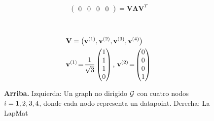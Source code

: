 {{{{\begin{figure}[H]
\begin{center}
\begin{minipage}{0.4\textwidth}
\begin{equation}
\begin{pmatrix}
							0 & 0 & 0 & 0 
						\end{pmatrix}\!=\!\mathbf{V} {\bm \Lambda} \mathbf{V}^{T}  
						\nonumber
					\end{equation} 
				\end{minipage}
				\vspace*{20mm}\\
				  \begin{minipage}{0.4\textwidth}
				\end{minipage} 
    		\begin{minipage}{0.4\textwidth}
										\begin{align}
											& \mathbf{V} = \big( {\bf v}^{(1)},{\bf v}^{(2)},{\bf v}^{(3)},{\bf v}^{(4)} \big) \nonumber \\
											&	\mathbf{v}^{(1)}\!=\!\frac{1}{\sqrt{3}} \begin{pmatrix} 1 \\ 1 \\ 1 \\ 0 \end{pmatrix}, \,
												\mathbf{v}^{(2)}\!=\!\begin{pmatrix} 0 \\ 0 \\ 0 \\ 1 \end{pmatrix} \nonumber 
												\end{align}
				\end{minipage} 
				\caption{\label{fig_lap_mtx_specclustering_dict} {\bf Arriba.} Izquierda: Un \gls{graph} no dirigido
					$\mathcal{G}$ con cuatro nodos $i=1,2,3,4$, donde cada nodo representa un \gls{datapoint}. Derecha: La \gls{LapMat} 
}
\end{center}
\end{figure}}}}}
